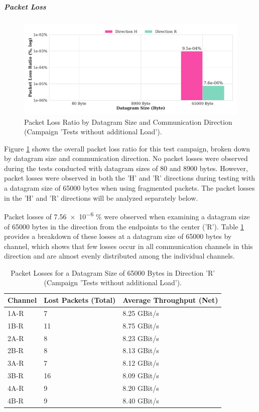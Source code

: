 \subparagraph{Packet Loss}

\begin{figure}[h!]
    \centering
    \includegraphics[width=1\linewidth]{figures/reliability/ihawk/diagr3.pdf}
    \caption{Packet Loss Ratio by Datagram Size and Communication Direction (Campaign 'Tests without additional Load').}
    \label{fig:diagr3Loss}
\end{figure}

Figure \ref{fig:diagr3Loss} shows the overall packet loss ratio for this test campaign, broken down by datagram size and communication direction. No packet losses were observed during the tests conducted with datagram sizes of 80 and 8900 bytes. However, packet losses were observed in both the 'H' and 'R' directions during testing with a datagram size of 65000 bytes when using fragmented packets. The packet losses in the 'H' and 'R' directions will be analyzed separately below.

Packet losses of \num{7.56e-6} \% were observed when examining a datagram size of 65000 bytes in the direction from the endpoints to the center ('R'). Table \ref{tab:dirRLoss} provides a breakdown of these losses at a datagram size of 65000 bytes by channel, which shows that few losses occur in all communication channels in this direction and are almost evenly distributed among the individual channels.

\begin{table}[h]
\centering
\begin{tabular}{lll}
	\toprule
	Channel & Lost Packets (Total) & Average Throughput (Net) \\
	\midrule
	1A-R & 7  & 8.25 GBit/s \\ 
 	1B-R & 11 & 8.75 GBit/s \\
	2A-R & 8  & 8.23 GBit/s \\
 	2B-R & 8  & 8.13 GBit/s \\
 	3A-R & 7  & 8.12 GBit/s \\
 	3B-R & 16 & 8.09 GBit/s \\
 	4A-R & 9  & 8.20 GBit/s \\
 	4B-R & 9  & 8.40 GBit/s \\
	\bottomrule
\end{tabular}
\caption{Packet Losses for a Datagram Size of 65000 Bytes in Direction 'R' (Campaign 'Tests without additional Load').}
\label{tab:dirRLoss}
\end{table}

